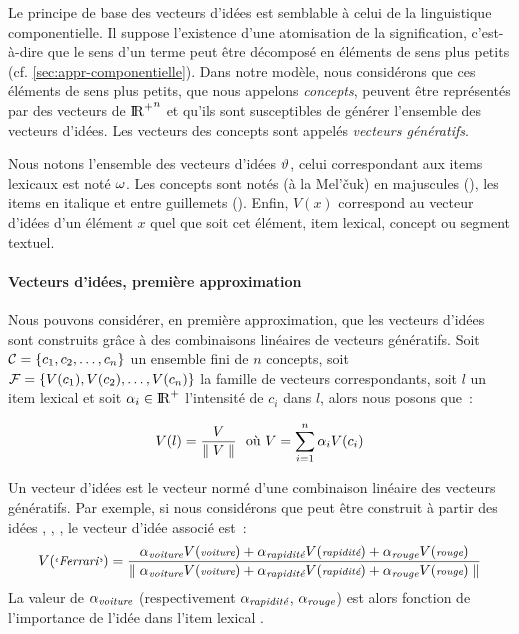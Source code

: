 {\label{sec:famGen}

Le principe de base des vecteurs d'idées est
semblable à celui de la linguistique componentielle. Il suppose
l'existence d'une atomisation de la signification, c'est-à-dire que le
sens d'un terme peut être décomposé en éléments de sens plus petits
(cf.  \ref{sec:appr-componentielle}). Dans notre modèle, nous
considérons que ces éléments de sens plus petits, que nous appelons
\emph{concepts}, peuvent être représentés par des vecteurs de ${\rm{I \! R}^{+}}^n$
et qu'ils sont susceptibles de générer l'ensemble des vecteurs
d'idées. Les vecteurs des concepts sont
appelés \emph{vecteurs génératifs}.

Nous notons l'ensemble des vecteurs d'idées
$\vartheta$, celui correspondant aux items lexicaux est noté $\omega$.
Les concepts sont notés (à la Mel'\v{c}uk) en majuscules
(), les items en italique et entre guillemets
(). Enfin, $V(x)$ correspond au vecteur
d'idées d'un élément $x$ quel que soit cet
élément, item lexical, concept ou segment textuel.

\paragraph{Vecteurs d'idées, première approximation}

Nous pouvons considérer, en première approximation, que les vecteurs
d'idées sont construits grâce à des
combinaisons linéaires de  vecteurs
génératifs. Soit ${\cal C}=\{c_1, c_2, \ldots, c_n\}$ un ensemble fini
de $n$ concepts, soit ${\cal F}=\{V(c_1), V(c_2), \ldots, V(c_n)\}$ la
famille de vecteurs correspondants, soit $l$ un item lexical et soit
$\alpha_i \in \rm{I \! R}^+$ l'intensité de $c_i$ dans $l$, alors nous posons
que~:

\begin{equation}
  \label{eq:combLinVC}
  V(l) = \frac{V}{\parallel V \parallel} \ \mbox{ où } V = \sum_{i=1}^n \alpha_i V(c_i)
\end{equation}

Un vecteur d'idées est le vecteur normé d'une
combinaison linéaire des  vecteurs
génératifs. Par exemple, si nous considérons que 
peut être construit à partir des idées , ,
, le vecteur d'idée associé est~:
%
\begin{equation}
  \label{eq:exRanger}
  V(\mbox{\lexItem{Ferrari}})=\frac{\alpha_{\cname{voiture}}V(\cname{voiture})+\alpha_{\cname{rapidité}}V(\cname{rapidité})+\alpha_{\cname{rouge}}V(\cname{rouge})}{\norm{\alpha_{\cname{voiture}}V(\cname{voiture})+\alpha_{\cname{rapidité}}V(\cname{rapidité})+\alpha_{\cname{rouge}}V(\cname{rouge})}}
\end{equation}
%
La valeur de $\alpha_{\emph{\textrm{\scriptsize{\relax{voiture}}}}}$ (respectivement
$\alpha_{\emph{\textrm{\scriptsize{\relax{rapidité}}}}}$, $\alpha_{\emph{\textrm{\scriptsize{\relax{rouge}}}}}$) est alors
fonction de l'importance de l'idée dans l'item lexical
.

}
